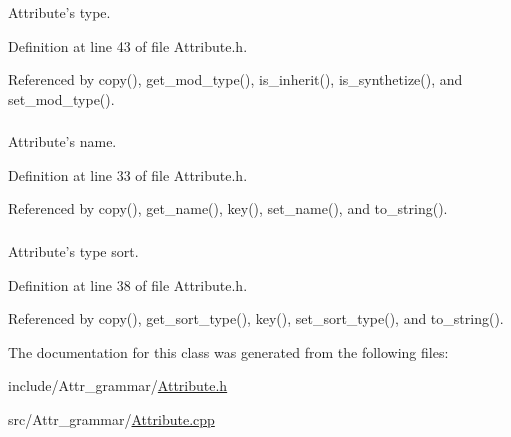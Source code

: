 Attribute's type. 



Definition at line 43 of file Attribute.h.



Referenced by copy(), get\_\-mod\_\-type(), is\_\-inherit(), is\_\-synthetize(), and set\_\-mod\_\-type().

\hypertarget{classgenevalmag_1_1Attribute_abae18584e82c30495a4ecb959f46921b}{
\subsubsection[{a\_\-name}]{}}
\label{classgenevalmag_1_1Attribute_abae18584e82c30495a4ecb959f46921b}


Attribute's name. 



Definition at line 33 of file Attribute.h.



Referenced by copy(), get\_\-name(), key(), set\_\-name(), and to\_\-string().

\hypertarget{classgenevalmag_1_1Attribute_a869f6c4c44a1e1513059a7dd26e56266}{
\subsubsection[{a\_\-sort\_\-type}]{}}
\label{classgenevalmag_1_1Attribute_a869f6c4c44a1e1513059a7dd26e56266}


Attribute's type sort. 



Definition at line 38 of file Attribute.h.



Referenced by copy(), get\_\-sort\_\-type(), key(), set\_\-sort\_\-type(), and to\_\-string().



The documentation for this class was generated from the following files:\begin{DoxyCompactItemize}
\item 
include/Attr\_\-grammar/\hyperlink{Attribute_8h}{Attribute.h}\item 
src/Attr\_\-grammar/\hyperlink{Attribute_8cpp}{Attribute.cpp}\end{DoxyCompactItemize}
